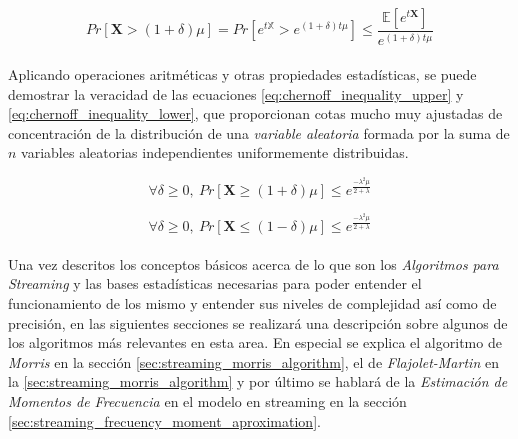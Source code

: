 \documentclass{subfiles}
\begin{document}
        \begin{equation}
        \label{eq:chernoff_inequality_raw}
          Pr[ \boldsymbol{X} > (1+\delta) \mu] =
          Pr[ e^{t \mathbb{X}} > e^{(1+\delta)t\mu}] \leq
          \frac{\mathbb{E}[ e^{t \boldsymbol{X}}] }{e^{(1 + \delta) t \mu}}
        \end{equation}

        \paragraph{}
        Aplicando operaciones aritméticas y otras propiedades estadísticas, se puede demostrar la veracidad de las ecuaciones \eqref{eq:chernoff_inequality_upper} y \eqref{eq:chernoff_inequality_lower}, que proporcionan cotas mucho muy ajustadas de concentración de la distribución de una \emph{variable aleatoria} formada por la suma de $n$ variables aleatorias independientes uniformemente distribuidas.

        \begin{equation}
        \label{eq:chernoff_inequality_upper}
          \forall \delta \geq 0, \ Pr[\boldsymbol{X} \geq (1 + \delta)\mu]  \leq e^\frac{-\lambda^2\mu}{2 + \lambda}
        \end{equation}

        \begin{equation}
        \label{eq:chernoff_inequality_lower}
          \forall \delta \geq 0, \ Pr[\boldsymbol{X} \leq (1 - \delta)\mu]  \leq e^\frac{-\lambda^2\mu}{2 + \lambda}
        \end{equation}

    \paragraph{}
    Una vez descritos los conceptos básicos acerca de lo que son los \emph{Algoritmos para Streaming} y las bases estadísticas necesarias para poder entender el funcionamiento de los mismo y entender sus niveles de complejidad así como de precisión, en las siguientes secciones se realizará una descripción sobre algunos de los algoritmos más relevantes en esta area. En especial se explica el algoritmo de \emph{Morris} en la sección \ref{sec:streaming_morris_algorithm}, el de \emph{Flajolet-Martin} en la \ref{sec:streaming_morris_algorithm} y por último se hablará de la \emph{Estimación de Momentos de Frecuencia} en el modelo en streaming en la sección \ref{sec:streaming_frecuency_moment_aproximation}.
\end{document}
